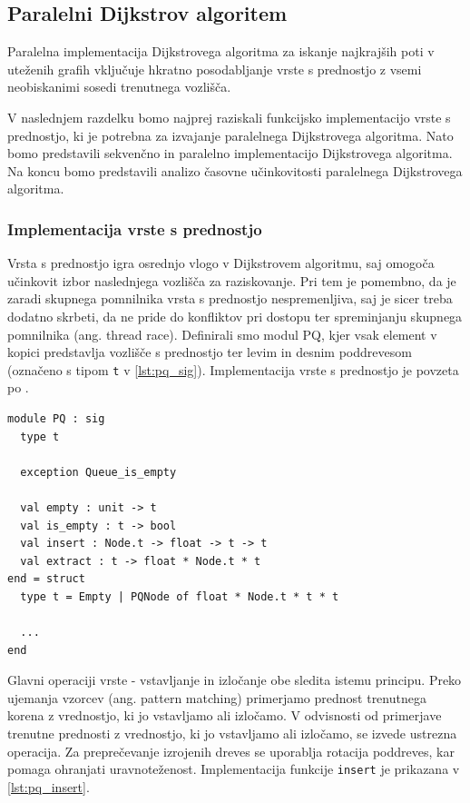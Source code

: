 \documentclass[fin1, tisk]{fmfdelo}
\begin{document}
\subsection{Paralelni Dijkstrov algoritem} \label{section:dijkstra}

Paralelna implementacija Dijkstrovega algoritma za iskanje najkrajših poti v uteženih grafih vključuje hkratno posodabljanje
vrste s prednostjo z vsemi neobiskanimi sosedi trenutnega vozlišča.

V naslednjem razdelku bomo najprej raziskali funkcijsko implementacijo vrste s prednostjo, ki je potrebna za izvajanje
paralelnega Dijkstrovega algoritma. Nato bomo predstavili sekvenčno in paralelno implementacijo Dijkstrovega algoritma. 
Na koncu bomo predstavili analizo časovne učinkovitosti paralelnega Dijkstrovega algoritma.

\subsubsection{Implementacija vrste s prednostjo}

Vrsta s prednostjo igra osrednjo vlogo v Dijkstrovem algoritmu, saj omogoča učinkovit izbor naslednjega vozlišča za raziskovanje. 
Pri tem je pomembno, da je zaradi skupnega pomnilnika vrsta s prednostjo nespremenljiva, saj je sicer treba
dodatno skrbeti, da ne pride do konfliktov pri dostopu ter spreminjanju skupnega pomnilnika (ang. thread race). 
Definirali smo modul PQ, kjer vsak element v kopici predstavlja vozlišče s prednostjo ter levim in desnim poddrevesom
(označeno s tipom \texttt{t} v \ref{lst:pq_sig}). Implementacija vrste s prednostjo je povzeta po \cite{okasaki1996}.

\begin{lstlisting}[label=lst:pq_sig]
module PQ : sig
  type t

  exception Queue_is_empty

  val empty : unit -> t
  val is_empty : t -> bool
  val insert : Node.t -> float -> t -> t
  val extract : t -> float * Node.t * t
end = struct
  type t = Empty | PQNode of float * Node.t * t * t

  ...
end
\end{lstlisting}

Glavni operaciji vrste - vstavljanje in izločanje obe sledita istemu principu. Preko ujemanja vzorcev (ang. pattern matching)
primerjamo prednost trenutnega korena z vrednostjo, ki jo vstavljamo ali izločamo. V odvisnosti od primerjave trenutne
prednosti z vrednostjo, ki jo vstavljamo ali izločamo, se izvede ustrezna operacija. Za preprečevanje izrojenih dreves
se uporablja rotacija poddreves, kar pomaga ohranjati uravnoteženost. Implementacija funkcije \texttt{insert} je prikazana
v \ref{lst:pq_insert}.
\end{document}
